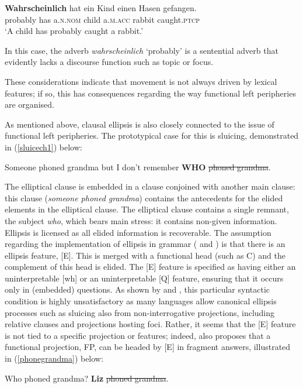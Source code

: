 \ea \gll \textbf{Wahrscheinlich} hat ein Kind einen Hasen gefangen.\\
probably has a.\textsc{n.nom} child a.\textsc{m.acc} rabbit caught.\textsc{ptcp}\\
\glt `A child has probably caught a rabbit.'
\z

In this case, the adverb \textit{wahrscheinlich} `probably' is a sentential adverb that evidently lacks a discourse function such as topic or focus.

These considerations indicate that movement is not always driven by lexical features; if so, this has consequences regarding the way functional left peripheries are organised.

As mentioned above, clausal ellipsis is also closely connected to the issue of functional left peripheries. The prototypical case for this is sluicing, demonstrated in (\ref{sluicech1}) below:

\ea\label{sluicech1} Someone phoned grandma but I don't remember \textbf{WHO} \sout{phoned grandma}.\z

The elliptical clause is embedded in a clause conjoined with another main clause: this clause (\textit{someone phoned grandma}) contains the antecedents for the elided elements in the elliptical clause. The elliptical clause contains a single remnant, the subject \textit{who}, which bears main stress: it contains non-given information. Ellipsis is licensed as all elided information is recoverable. The assumption regarding the implementation of ellipsis in grammar (\citealt[55--61]{merchant2001} and \citealt[670--673]{merchant2004}) is that there is an ellipsis feature, [E]. This is merged with a functional head (such as C) and the complement of this head is elided. The [E] feature is specified as having either an uninterpretable [wh] or an uninterpretable [Q] feature, ensuring that it occurs only in (embedded) questions. As shown by \citet{vancraenenbroeckliptak2006} and \citet{hoytteodorescu2012}, this particular syntactic condition is highly unsatisfactory as many languages allow canonical ellipsis processes such as sluicing also from non-interrogative projections, including relative clauses and projections hosting foci. Rather, it seems that the [E] feature is not tied to a specific projection or features; indeed, \citet{merchant2004} also proposes that a functional projection, FP, can be headed by [E] in fragment answers, illustrated in (\ref{phonegrandma}) below:

\begin{exe}
\ex \label{phonegrandma}
\begin{xlist} 
 Who phoned grandma?
 \textbf{Liz} \sout{phoned grandma}.
\end{xlist}
\end{exe}

